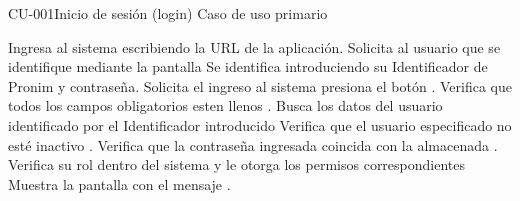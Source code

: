 \begin{UseCase}{CU-001}{Inicio de sesión (login) }
{		%
		Caso de uso primario
	}
\end{UseCase}

\begin{UCtrayectoria}
	
	\UCpaso[\UCactor] Ingresa al sistema escribiendo la URL de la aplicación.
	\UCpaso Solicita al usuario que se identifique mediante la pantalla 
	\UCpaso[\UCactor] \label{UC1.Datos} Se identifica introduciendo su Identificador de Pronim y contraseña.
	\UCpaso[\UCactor] Solicita el ingreso al sistema presiona el botón .
    \UCpaso Verifica que todos los campos obligatorios esten llenos .
	\UCpaso Busca los datos del usuario identificado por el Identificador introducido 
	\UCpaso Verifica que el usuario especificado no esté inactivo .
	\UCpaso Verifica que la contraseña ingresada coincida con la almacenada .\label{UC1.Contrasenia}
	\UCpaso Verifica su rol dentro del sistema y le otorga los permisos correspondientes
	\UCpaso Muestra la pantalla  con el mensaje .
\end{UCtrayectoria}


